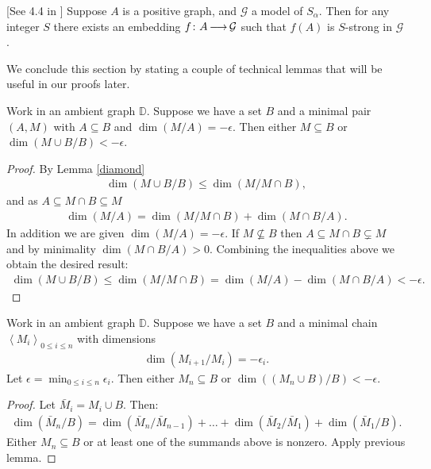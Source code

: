 \documentclass{amsart}
\newcommand{\DB}{\mathbb D}
\newcommand{\G}{\mathcal G}
\newcommand{\agl}[1]{\left\langle #1 \right\rangle}
\begin{document}
\begin{Lemma} \label{las_str} [See 4.4 in \cite{laskowski}]
  Suppose $A$ is a positive graph, and $\G$ a model of $S_\alpha$.
  Then for any integer $S$ there exists an embedding $f \colon A \arr \G$ such that $f(A)$ is $S$-strong in $\G$.
\end{Lemma}
    
We conclude this section by stating a couple of technical lemmas that will be useful in our proofs later.

\begin{Lemma} \label{minimal_over_set}
  Work in an ambient graph $\DB$.
  Suppose we have a set $B$ and a minimal pair $(A, M)$ with $A \subseteq B$ and $\dim(M/A) = -\epsilon$.
  Then either $M \subseteq B$ or $\dim(M \cup B/B) < -\epsilon$.
\end{Lemma}

\begin{proof}
  By Lemma \ref{diamond}
  \begin{align*}
    \dim(M \cup B/B) \leq \dim(M / M \cap B),
  \end{align*}
  and as $A \subseteq M \cap B \subseteq M$
  \begin{align*}
    \dim (M/A) = \dim(M / M \cap B) + \dim(M \cap B / A).
  \end{align*}
  In addition we are given $\dim (M/A) = -\epsilon$.
  If $M \not\subseteq B$ then $A \subseteq M \cap B \subsetneq M$ and by minimality $\dim(M \cap B / A) > 0$.
  Combining the inequalities above we obtain the desired result:
  \begin{align*}
    \dim(M \cup B/B) \leq \dim(M / M \cap B) = \dim (M/A) - \dim(M \cap B / A) < -\epsilon.
  \end{align*}
\end{proof}

\begin{Lemma}	\label{chain_lemma}
  Work in an ambient graph $\DB$.
  Suppose we have a set $B$ and a minimal chain  $\agl{M_i}_{0 \leq i \leq n}$ with dimensions
  \begin{align*}
    \dim(M_{i+1}/M_i) = -\epsilon_i.
  \end{align*}
  Let $\epsilon = \min_{0 \leq i \leq n} \epsilon_i$.
  Then either $M_n \subseteq B$ or $\dim((M_n \cup B)/B) < -\epsilon$.
\end{Lemma}

\begin{proof}
  Let $\bar M_i = M_i \cup B$. Then:
  \begin{align*}
    \dim(\bar M_n/B) = \dim(\bar M_n/\bar M_{n-1}) + \ldots + \dim(\bar M_2/\bar M_1) + \dim(\bar M_1/B).
  \end{align*}
  Either $M_n \subseteq B$ or at least one of the summands above is nonzero.
  Apply previous lemma.
\end{proof}
\end{document}
